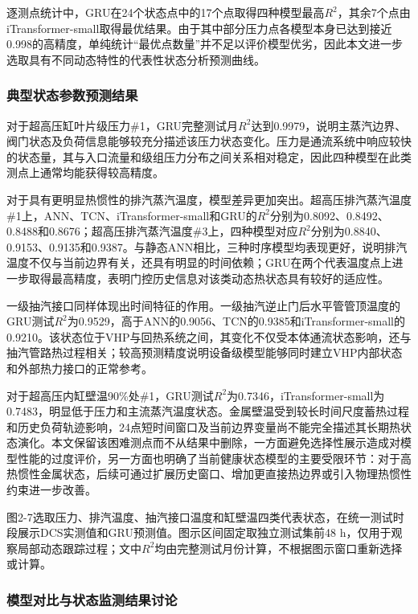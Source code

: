 逐测点统计中，GRU在24个状态点中的17个点取得四种模型最高$R^2$，其余7个点由iTransformer-small取得最优结果。由于其中部分压力点各模型本身已达到接近0.998的高精度，单纯统计“最优点数量”并不足以评价模型优劣，因此本文进一步选取具有不同动态特性的代表性状态分析预测曲线。

\subsubsection{典型状态参数预测结果}

对于超高压缸叶片级压力\#1，GRU完整测试月$R^2$达到0.9979，说明主蒸汽边界、阀门状态及负荷信息能够较充分描述该压力状态变化。压力是通流系统中响应较快的状态量，其与入口流量和级组压力分布之间关系相对稳定，因此四种模型在此类测点上通常均能获得较高精度。

对于具有更明显热惯性的排汽蒸汽温度，模型差异更加突出。超高压排汽蒸汽温度\#1上，ANN、TCN、iTransformer-small和GRU的$R^2$分别为0.8092、0.8492、0.8488和0.8676；超高压排汽蒸汽温度\#3上，四种模型对应$R^2$分别为0.8840、0.9153、0.9135和0.9387。与静态ANN相比，三种时序模型均表现更好，说明排汽温度不仅与当前边界有关，还具有明显的时间依赖；GRU在两个代表温度点上进一步取得最高精度，表明门控历史信息对该类动态热状态具有较好的适应性。

一级抽汽接口同样体现出时间特征的作用。一级抽汽逆止门后水平管管顶温度的GRU测试$R^2$为0.9529，高于ANN的0.9056、TCN的0.9385和iTransformer-small的0.9210。该状态位于VHP与回热系统之间，其变化不仅受本体通流状态影响，还与抽汽管路热过程相关；较高预测精度说明设备级模型能够同时建立VHP内部状态和外部热力接口的正常参考。

对于超高压内缸壁温90\%处\#1，GRU测试$R^2$为0.7346，iTransformer-small为0.7483，明显低于压力和主流蒸汽温度状态。金属壁温受到较长时间尺度蓄热过程和历史负荷轨迹影响，24点短时间窗口及当前边界变量尚不能完全描述其长期热状态演化。本文保留该困难测点而不从结果中删除，一方面避免选择性展示造成对模型性能的过度评价，另一方面也明确了当前健康状态模型的主要受限环节：对于高热惯性金属状态，后续可通过扩展历史窗口、增加更直接热边界或引入物理热惯性约束进一步改善。

图2-7选取压力、排汽温度、抽汽接口温度和缸壁温四类代表状态，在统一测试时段展示DCS实测值和GRU预测值。图示区间固定取独立测试集前48 h，仅用于观察局部动态跟踪过程；文中$R^2$均由完整测试月份计算，不根据图示窗口重新选择或计算。

\subsubsection{模型对比与状态监测结果讨论}

